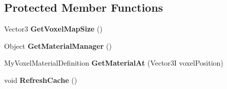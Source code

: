 \subsection*{Protected Member Functions}
\begin{DoxyCompactItemize}
\item 
\hypertarget{class_s_e_mod_a_p_i_internal_1_1_a_p_i_1_1_entity_1_1_sector_1_1_sector_object_1_1_voxel_map_a0f2103652f2cc50cee0985c6421bfe27}{}Vector3 {\bfseries Get\+Voxel\+Map\+Size} ()\label{class_s_e_mod_a_p_i_internal_1_1_a_p_i_1_1_entity_1_1_sector_1_1_sector_object_1_1_voxel_map_a0f2103652f2cc50cee0985c6421bfe27}

\item 
\hypertarget{class_s_e_mod_a_p_i_internal_1_1_a_p_i_1_1_entity_1_1_sector_1_1_sector_object_1_1_voxel_map_afe2718c6daa2b64f4be9a6dae6ee527d}{}Object {\bfseries Get\+Material\+Manager} ()\label{class_s_e_mod_a_p_i_internal_1_1_a_p_i_1_1_entity_1_1_sector_1_1_sector_object_1_1_voxel_map_afe2718c6daa2b64f4be9a6dae6ee527d}

\item 
\hypertarget{class_s_e_mod_a_p_i_internal_1_1_a_p_i_1_1_entity_1_1_sector_1_1_sector_object_1_1_voxel_map_a188eb43e04bcdfc35041800badb67739}{}My\+Voxel\+Material\+Definition {\bfseries Get\+Material\+At} (Vector3\+I voxel\+Position)\label{class_s_e_mod_a_p_i_internal_1_1_a_p_i_1_1_entity_1_1_sector_1_1_sector_object_1_1_voxel_map_a188eb43e04bcdfc35041800badb67739}

\item 
\hypertarget{class_s_e_mod_a_p_i_internal_1_1_a_p_i_1_1_entity_1_1_sector_1_1_sector_object_1_1_voxel_map_a6c4d7bc3e8f01fac7e528f37b34dacdd}{}void {\bfseries Refresh\+Cache} ()\label{class_s_e_mod_a_p_i_internal_1_1_a_p_i_1_1_entity_1_1_sector_1_1_sector_object_1_1_voxel_map_a6c4d7bc3e8f01fac7e528f37b34dacdd}

\end{DoxyCompactItemize}
